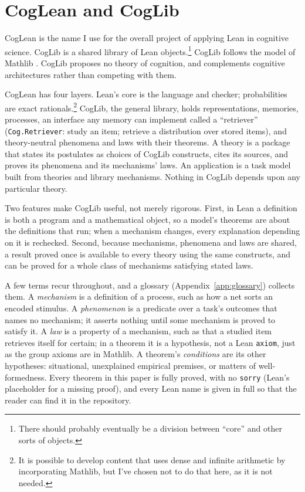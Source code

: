\documentclass[11pt]{article}
\newcommand{\code}[1]{\texttt{#1}}
\newcommand{\lean}[1]{\texttt{#1}}
\begin{document}
\section{CogLean and CogLib}
\label{sec:clcl}

CogLean is the name I use for the overall project of applying Lean in
cognitive science. CogLib is a shared library of Lean
objects.\footnote{There should probably eventually be a division
between ``core'' and other sorts of objects.} CogLib follows the model
of Mathlib \citep{mathlib2020,demoura2021}. CogLib proposes no theory
of cognition, and complements cognitive architectures rather than
competing with them.

CogLean has four layers. Lean's core is the language and checker;
probabilities are exact rationals.\footnote{It is possible to develop
content that uses dense and infinite arithmetic by incorporating
Mathlib, but I've chosen not to do that here, as it is not needed.}
CogLib, the general library, holds representations, memories,
processes, an interface any memory can implement called a
``retriever'' (\lean{Cog.Retriever}: study an item; retrieve a
distribution over stored items), and theory-neutral phenomena and laws
with their theorems. A theory is a package that states its postulates
as choices of CogLib constructs, cites its sources, and proves its
phenomena and its mechanisms' laws. An application is a task model
built from theories and library mechanisms. Nothing in CogLib depends
upon any particular theory.

Two features make CogLib useful, not merely rigorous. First, in Lean a
definition is both a program and a mathematical object, so a model's
theorems are about the definitions that run; when a mechanism changes,
every explanation depending on it is rechecked. Second, because
mechanisms, phenomena and laws are shared, a result proved once is
available to every theory using the same constructs, and can be proved
for a whole class of mechanisms satisfying stated laws.

A few terms recur throughout, and a glossary (Appendix~\ref{app:glossary})
collects them. A \emph{mechanism} is a definition of a process, such
as how a net sorts an encoded stimulus. A \emph{phenomenon} is a
predicate over a task's outcomes that names no mechanism; it asserts
nothing until some mechanism is proved to satisfy it. A \emph{law} is a
property of a mechanism, such as that a studied item retrieves itself
for certain; in a theorem it is a hypothesis, not a Lean \code{axiom},
just as the group axioms are in Mathlib. A theorem's
\emph{conditions} are its other hypotheses: situational, unexplained
empirical premises, or matters of well-formedness. Every theorem in
this paper is fully proved, with no \code{sorry} (Lean's placeholder
for a missing proof), and every Lean name is given in full so that the
reader can find it in the repository.
\end{document}
